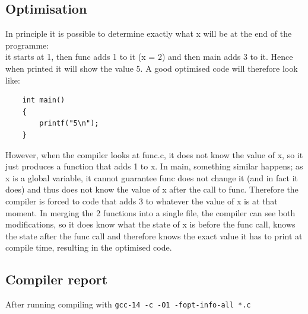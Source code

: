 

\subsection{Optimisation} 
    In principle it is possible to determine exactly what x will be at the end of the programme: \\
    it starts at 1, then func adds 1 to it (x = 2) and then main adds 3 to it. Hence when printed it will show the value 5.
    A good optimised code will therefore look like:
    
\begin{lstlisting}
    int main()
    {
        printf("5\n");
    }
\end{lstlisting}

However, when the compiler looks at func.c, it does not know the value of x, so it just produces a function that adds 1 to x. In main, something similar happens; 
as x is a global variable, it cannot guarantee func does not change it (and in fact it does) and thus does not know the value of x after the call to func. Therefore the compiler is forced to code that adds 3
to whatever the value of x is at that moment. In merging the 2 functions into a single file, the compiler can see both modifications, so it does know what the state of x is before the func call, knows the state after the func call and therefore knows the exact value it has to
print at compile time, resulting in the optimised code. 


\subsection{Compiler report}
After running compiling with \texttt{gcc-14 -c -O1 -fopt-info-all *.c}



